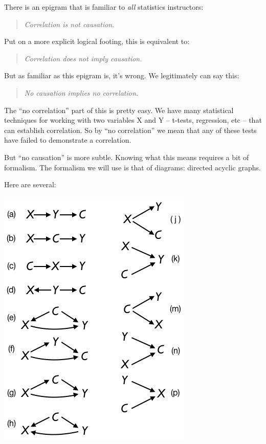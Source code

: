 \documentclass[nofonts,]{tufte-handout}
\begin{document}
There is an epigram that is familiar to \emph{all} statistics
instructors:

\begin{quote}
\emph{Correlation is not causation.}
\end{quote}

Put on a more explicit logical footing, this is equivalent to:

\begin{quote}
\emph{Correlation does not imply causation.}
\end{quote}

But as familiar as this epigram is, it's wrong. We legitimately can say
this:

\begin{quote}
\emph{No causation implies no correlation.}
\end{quote}

The ``no correlation'' part of this is pretty easy. We have many
statistical techniques for working with two variables X and Y --
t-tests, regression, etc -- that can establish correlation. So by ``no
correlation'' we mean that any of these tests have failed to demonstrate
a correlation.

But ``no causation'' is more subtle. Knowing what this means requires a
bit of formalism. The formalism we will use is that of diagrams:
directed acyclic graphs.

Here are several:

\includegraphics{../../static../../static../../static/images/many-dags.png}
\end{document}
